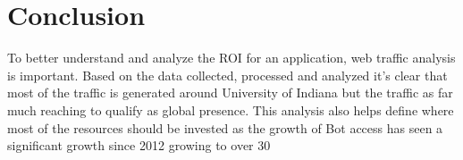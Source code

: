 \section{Conclusion}

To better understand and analyze the ROI for an application, web traffic analysis is important. Based on the data collected, processed and analyzed it’s clear that most of the traffic is generated around University of Indiana but the traffic as far much reaching to qualify as global presence. This analysis also helps define where most of the resources should be invested as the growth of Bot access has seen a significant growth since 2012 growing to over 30%
